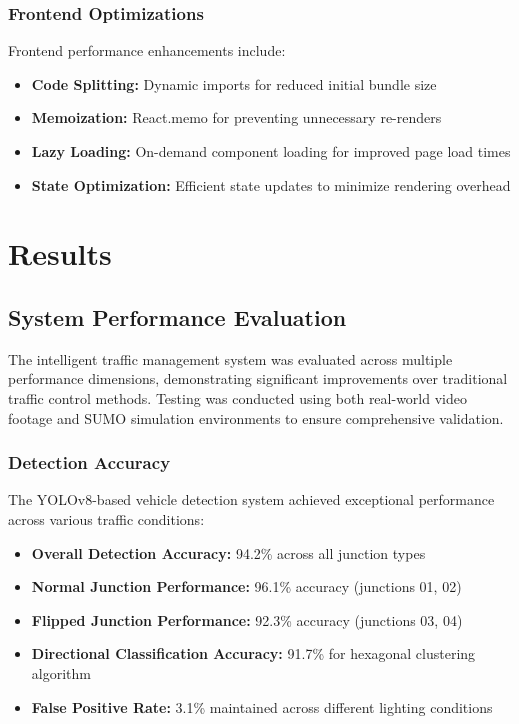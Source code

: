 \documentclass[conference]{IEEEtran}
\begin{document}
\subsubsection{Frontend Optimizations}

Frontend performance enhancements include:

\begin{itemize}
\item \textbf{Code Splitting:} Dynamic imports for reduced initial bundle size
\item \textbf{Memoization:} React.memo for preventing unnecessary re-renders
\item \textbf{Lazy Loading:} On-demand component loading for improved page load times
\item \textbf{State Optimization:} Efficient state updates to minimize rendering overhead
\end{itemize}

\section{Results}

\subsection{System Performance Evaluation}

The intelligent traffic management system was evaluated across multiple performance dimensions, demonstrating significant improvements over traditional traffic control methods. Testing was conducted using both real-world video footage and SUMO simulation environments to ensure comprehensive validation.

\subsubsection{Detection Accuracy}

The YOLOv8-based vehicle detection system achieved exceptional performance across various traffic conditions:

\begin{itemize}
\item \textbf{Overall Detection Accuracy:} 94.2\% across all junction types
\item \textbf{Normal Junction Performance:} 96.1\% accuracy (junctions 01, 02)
\item \textbf{Flipped Junction Performance:} 92.3\% accuracy (junctions 03, 04)
\item \textbf{Directional Classification Accuracy:} 91.7\% for hexagonal clustering algorithm
\item \textbf{False Positive Rate:} 3.1\% maintained across different lighting conditions
\end{itemize}
\end{document}
